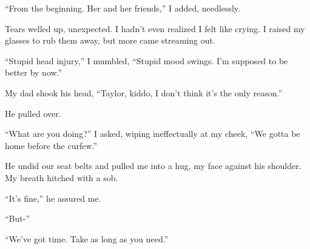 ``From the beginning. Her and her friends,'' I added, needlessly.



Tears welled up, unexpected.  I hadn't even realized I felt like crying.  I raised my glasses to rub them away, but more came streaming out.



``Stupid head injury,'' I mumbled, ``Stupid mood swings.  I'm supposed to be better by now.''



My dad shook his head, ``Taylor, kiddo, I don't think it's the only reason.''



He pulled over.



``What are you doing?'' I asked, wiping ineffectually at my cheek, ``We gotta be home before the curfew.''



He undid our seat belts and pulled me into a hug, my face against his shoulder.  My breath hitched with a sob.



``It's fine,'' he assured me.



``But-''



``We've got time.  Take as long as you need.''





